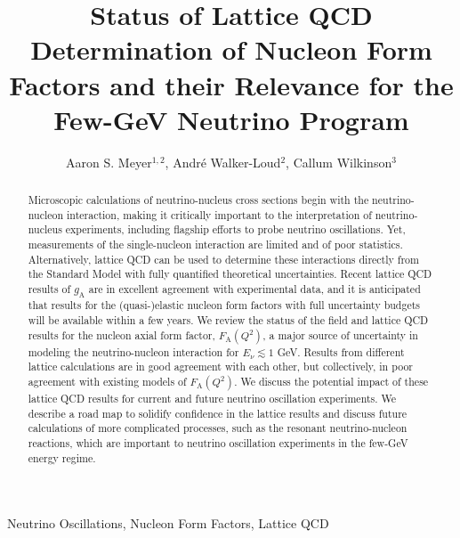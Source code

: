 \documentclass{ar-1col}
\newcommand{\change}[1]{{\color{red} #1}}
\begin{document}

\title{Status of Lattice QCD Determination of Nucleon Form Factors
 and their Relevance for the Few-GeV Neutrino Program}

\author{Aaron S. Meyer$^{1,2}$,
Andr\'{e} Walker-Loud$^2$,
Callum Wilkinson$^3$
}

\begin{abstract}
Microscopic calculations of neutrino-nucleus cross sections begin with the neutrino-nucleon interaction, making it critically important to the interpretation of neutrino-nucleus experiments, including flagship efforts to probe neutrino oscillations.
Yet, measurements of the single-nucleon interaction are limited and of poor statistics.
Alternatively, lattice QCD can be used to determine these interactions directly from the Standard Model with fully quantified theoretical uncertainties.
Recent lattice QCD results of $g_{\mathrm{A}}$ are in excellent agreement with experimental data,
and it is anticipated that results for the (quasi-)elastic nucleon form factors with full uncertainty budgets will be available within a \change{few} years.
We review the status of the field and lattice QCD results for the nucleon axial form factor, $F_{\mathrm{A}}(Q^2)$, a major source of uncertainty in modeling the neutrino-nucleon interaction for $E_{\nu} \lesssim 1$ GeV.
Results from different lattice calculations are in good agreement with each other, but collectively, in poor agreement with existing models of $F_{\mathrm{A}}(Q^2)$.
We discuss the potential impact of these lattice QCD results for current and future neutrino oscillation experiments.
We describe a road map to solidify confidence in the lattice results and discuss future calculations of more complicated processes, such as the resonant neutrino-nucleon reactions, which are important
to neutrino oscillation experiments in the few-GeV energy regime.
\end{abstract}

\begin{keywords}
Neutrino Oscillations, Nucleon Form Factors, Lattice QCD
\end{keywords}
\end{document}
